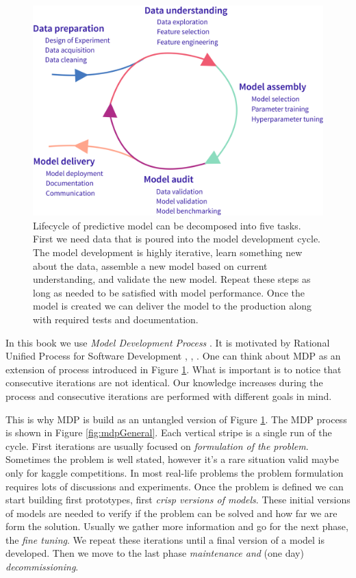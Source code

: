 \documentclass[]{krantz}
\begin{document}
\begin{figure}

{\centering \includegraphics[width=0.6\linewidth]{figure/MDP_washmachine} 

}

\caption{Lifecycle of predictive model can be decomposed into five tasks. First we need data that is poured into the model development cycle. The model development is highly iterative, learn something new about the data, assemble a new model based on current understanding, and validate the new model. Repeat these steps as long as needed to be satisfied with model performance. Once the model is created we can deliver the model to the production along with required tests and documentation.}\label{fig:MDPwashmachine}
\end{figure}

In this book we use \emph{Model Development Process} \citep{mdp2019}. It is motivated by Rational Unified Process for Software Development \citep{rup1998}, \citep{usdp1999}, \citep{spiral1988}. One can think about MDP as an extension of process introduced in Figure \ref{fig:MDPwashmachine}. What is important is to notice that consecutive iterations are not identical. Our knowledge increases during the process and consecutive iterations are performed with different goals in mind.

This is why MDP is build as an untangled version of Figure \ref{fig:MDPwashmachine}. The MDP process is shown in Figure \ref{fig:mdpGeneral}. Each vertical stripe is a single run of the cycle.
First iterations are usually focused on \emph{formulation of the problem}. Sometimes the problem is well stated, however it's a rare situation valid maybe only for kaggle competitions. In most real-life problems the problem formulation requires lots of discussions and experiments. Once the problem is defined we can start building first prototypes, first \emph{crisp versions of models}. These initial versions of models are needed to verify if the problem can be solved and how far we are form the solution. Usually we gather more information and go for the next phase, the \emph{fine tuning}. We repeat these iterations until a final version of a model is developed. Then we move to the last phase \emph{maintenance and} (one day) \emph{decommissioning}.
\end{document}
